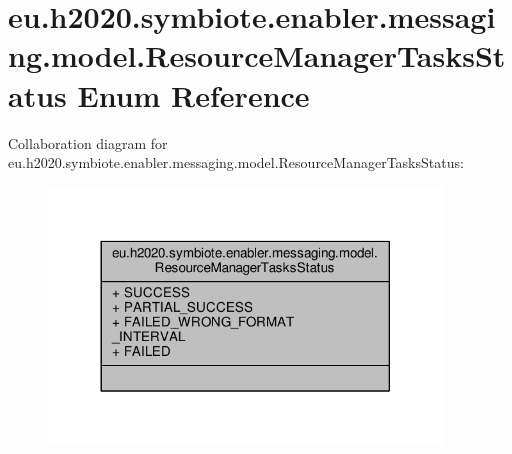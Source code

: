 \hypertarget{enumeu_1_1h2020_1_1symbiote_1_1enabler_1_1messaging_1_1model_1_1ResourceManagerTasksStatus}{}\section{eu.\+h2020.\+symbiote.\+enabler.\+messaging.\+model.\+Resource\+Manager\+Tasks\+Status Enum Reference}
\label{enumeu_1_1h2020_1_1symbiote_1_1enabler_1_1messaging_1_1model_1_1ResourceManagerTasksStatus}


Collaboration diagram for eu.\+h2020.\+symbiote.\+enabler.\+messaging.\+model.\+Resource\+Manager\+Tasks\+Status\+:\nopagebreak
\begin{figure}[H]
\begin{center}
\leavevmode
\includegraphics[width=296pt]{enumeu_1_1h2020_1_1symbiote_1_1enabler_1_1messaging_1_1model_1_1ResourceManagerTasksStatus__coll__graph}
\end{center}
\end{figure}
